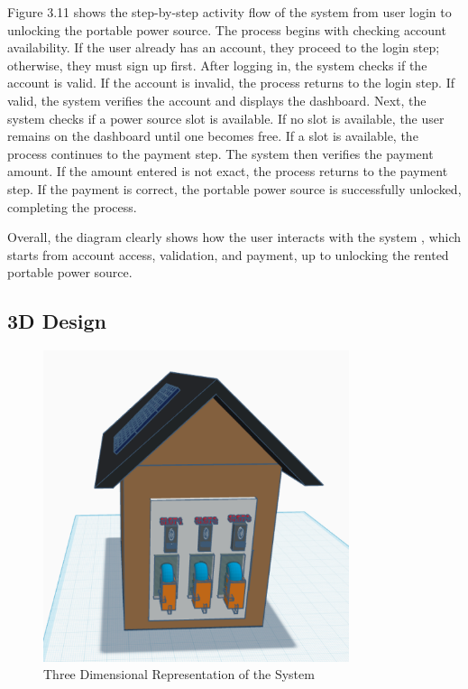 {Figure 3.11 shows the step-by-step activity flow of the system from user login to unlocking the portable power source. The process begins with checking account availability. If the user already has an account, they proceed to the login step; otherwise, they must sign up first. After logging in, the system checks if the account is valid. If the account is invalid, the process returns to the login step. If valid, the system verifies the account and displays the dashboard. Next, the system checks if a power source slot is available. If no slot is available, the user remains on the dashboard until one becomes free. If a slot is available, the process continues to the payment step. The system then verifies the payment amount. If the amount entered is not exact, the process returns to the payment step. If the payment is correct, the portable power source is successfully unlocked, completing the process.
 
 Overall, the diagram clearly shows how the user interacts with the system , which starts from account access, validation, and payment, up to unlocking the rented portable power source.

   
  \subsection{3D Design}
  
    \begin{figure}[H]
  	\centering
  	\caption{Three Dimensional Representation of the System}
  	\label{fig:3d}
  	\includegraphics[width=0.8\textwidth]{figures/3D.png}
  \end{figure}
  
}
